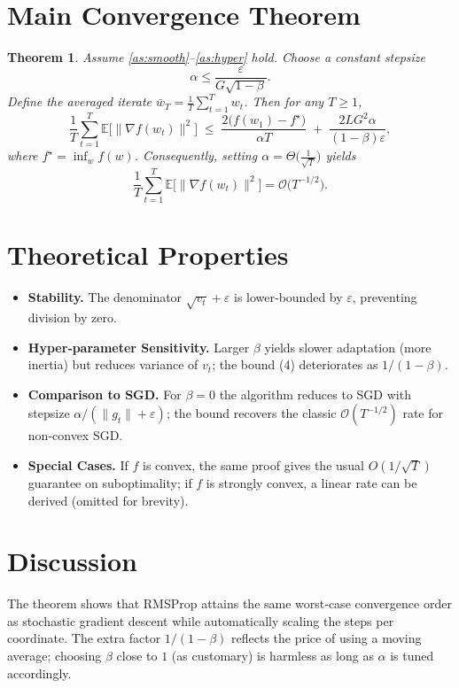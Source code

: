 \documentclass{article}
\newtheorem{theorem}{Theorem}
\newcommand{\E}{\mathbb{E}}
\begin{document}
\section*{Main Convergence Theorem}
\begin{theorem}\label{thm:main}
Assume \ref{as:smooth}–\ref{as:hyper} hold.  
Choose a constant stepsize
\[
\alpha\le \frac{\varepsilon}{G\sqrt{1-\beta}} .
\]
Define the averaged iterate $\bar w_{T}= \frac{1}{T}\sum_{t=1}^{T} w_{t}$.  
Then for any $T\ge1$,
\[
\frac{1}{T}\sum_{t=1}^{T}\E\!\big[\|\nabla f(w_{t})\|^{2}\big]
\;\le\;
\frac{2\big(f(w_{1})-f^{\star}\big)}{\alpha T}
\;+\;
\frac{2L G^{2}\alpha}{(1-\beta)\varepsilon},
\tag{4}
\]
where $f^{\star}=\inf_{w}f(w)$.  
Consequently, setting $\alpha = \Theta\!\big(\frac{1}{\sqrt{T}}\big)$ yields
\[
\frac{1}{T}\sum_{t=1}^{T}\E\!\big[\|\nabla f(w_{t})\|^{2}\big]=\mathcal O\!\big(T^{-1/2}\big).
\]
\end{theorem}

\section*{Theoretical Properties}
\begin{itemize}
\item \textbf{Stability.} The denominator $\sqrt{v_{t}}+\varepsilon$ is lower‑bounded by $\varepsilon$, preventing division by zero.
\item \textbf{Hyper‑parameter Sensitivity.} Larger $\beta$ yields slower adaptation (more inertia) but reduces variance of $v_{t}$; the bound (4) deteriorates as $1/(1-\beta)$.
\item \textbf{Comparison to SGD.} For $\beta=0$ the algorithm reduces to SGD with stepsize $\alpha/(\|g_{t}\|+\varepsilon)$; the bound recovers the classic $\mathcal O(T^{-1/2})$ rate for non‑convex SGD.
\item \textbf{Special Cases.} If $f$ is convex, the same proof gives the usual $O(1/\sqrt{T})$ guarantee on suboptimality; if $f$ is strongly convex, a linear rate can be derived (omitted for brevity).
\end{itemize}

\section*{Discussion}
The theorem shows that RMSProp attains the same worst‑case convergence order as stochastic gradient descent while automatically scaling the steps per coordinate. The extra factor $1/(1-\beta)$ reflects the price of using a moving average; choosing $\beta$ close to $1$ (as customary) is harmless as long as $\alpha$ is tuned accordingly.
\end{document}
